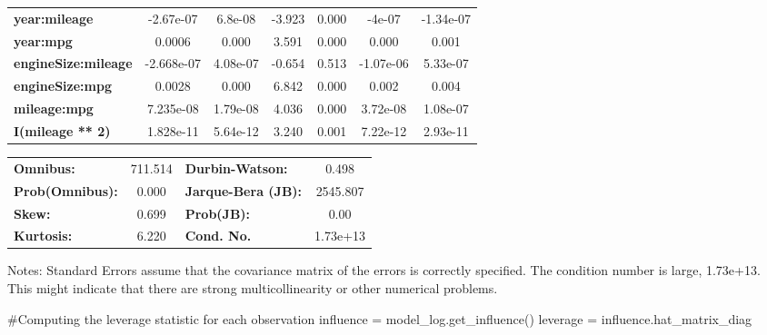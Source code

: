 \documentclass[
  letterpaper,
  DIV=11,
  numbers=noendperiod]{scrreprt}
\newenvironment{Shaded}{\begin{snugshade}}{\end{snugshade}}
\newcommand{\CommentTok}[1]{\textcolor[rgb]{0.37,0.37,0.37}{#1}}
\newcommand{\NormalTok}[1]{\textcolor[rgb]{0.00,0.23,0.31}{#1}}
\newcommand{\OperatorTok}[1]{\textcolor[rgb]{0.37,0.37,0.37}{#1}}
\begin{document}
\begin{center}
\begin{tabular}{lcccccc}
\textbf{year:mileage}       &    -2.67e-07  &      6.8e-08     &    -3.923  &         0.000        &       -4e-07    &    -1.34e-07     \\
\textbf{year:mpg}           &       0.0006  &        0.000     &     3.591  &         0.000        &        0.000    &        0.001     \\
\textbf{engineSize:mileage} &   -2.668e-07  &     4.08e-07     &    -0.654  &         0.513        &    -1.07e-06    &     5.33e-07     \\
\textbf{engineSize:mpg}     &       0.0028  &        0.000     &     6.842  &         0.000        &        0.002    &        0.004     \\
\textbf{mileage:mpg}        &    7.235e-08  &     1.79e-08     &     4.036  &         0.000        &     3.72e-08    &     1.08e-07     \\
\textbf{I(mileage ** 2)}    &    1.828e-11  &     5.64e-12     &     3.240  &         0.001        &     7.22e-12    &     2.93e-11     \\
\bottomrule
\end{tabular}
\begin{tabular}{lclc}
\textbf{Omnibus:}       & 711.514 & \textbf{  Durbin-Watson:     } &    0.498  \\
\textbf{Prob(Omnibus):} &   0.000 & \textbf{  Jarque-Bera (JB):  } & 2545.807  \\
\textbf{Skew:}          &   0.699 & \textbf{  Prob(JB):          } &     0.00  \\
\textbf{Kurtosis:}      &   6.220 & \textbf{  Cond. No.          } & 1.73e+13  \\
\bottomrule
\end{tabular}
\end{center}

Notes: \newline
 [1] Standard Errors assume that the covariance matrix of the errors is correctly specified. \newline
 [2] The condition number is large, 1.73e+13. This might indicate that there are \newline
 strong multicollinearity or other numerical problems.

\begin{Shaded}
\begin{Highlighting}[]
\CommentTok{\#Computing the leverage statistic for each observation}
\NormalTok{influence }\OperatorTok{=}\NormalTok{ model\_log.get\_influence()}
\NormalTok{leverage }\OperatorTok{=}\NormalTok{ influence.hat\_matrix\_diag}
\end{Highlighting}
\end{Shaded}
\end{document}
